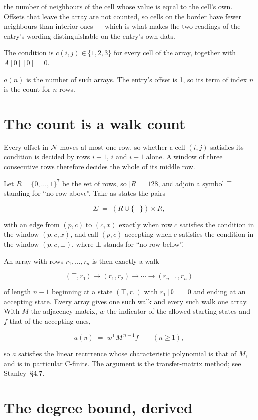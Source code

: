\documentclass[11pt]{article}
\theoremstyle{definition}
\begin{document}
the number of neighbours of the cell whose value is equal to the cell's own. Offsets that leave the array are not counted, so cells on the border have fewer neighbours than interior ones --- which is what makes the two readings of the entry's wording distinguishable on the entry's own data.

The condition is $c(i,j) \in \{1, 2, 3\}$ for every cell of the array, together with $A[0][0]=0$.

$a(n)$ is the number of such arrays. The entry's offset is 1, so its term of index $n$ is the count for $n$ rows.

\section{The count is a walk count}

Every offset in $\mathcal{N}$ moves at most one row, so whether a cell $(i,j)$ satisfies its condition is decided by rows $i-1$, $i$ and $i+1$ alone. A window of three consecutive rows therefore decides the whole of its middle row.

Let $R = \{0,\dots,1\}^{7}$ be the set of rows, so $|R| = 128$, and adjoin a symbol $\top$ standing for ``no row above''. Take as states the pairs

\[\Sigma \;=\; (R \cup \{\top\}) \times R,\]

with an edge from $(p,c)$ to $(c,x)$ exactly when row $c$ satisfies the condition in the window $(p,c,x)$, and call $(p,c)$ accepting when $c$ satisfies the condition in the window $(p,c,\bot)$, where $\bot$ stands for ``no row below''.

An array with rows $r_1,\dots,r_n$ is then exactly a walk

\[(\top,r_1) \to (r_1,r_2) \to \cdots \to (r_{n-1},r_n)\]

of length $n-1$ beginning at a state $(\top,r_1)$ with $r_1[0]=0$ and ending at an accepting state. Every array gives one such walk and every such walk one array. With $M$ the adjacency matrix, $w$ the indicator of the allowed starting states and $f$ that of the accepting ones,

\[a(n) \;=\; w^{\mathsf T} M^{\,n-1} f \qquad (n \ge 1),\]

so $a$ satisfies the linear recurrence whose characteristic polynomial is that of $M$, and is in particular C-finite. The argument is the transfer-matrix method; see Stanley~\S4.7.

\section{The degree bound, derived}
\end{document}
